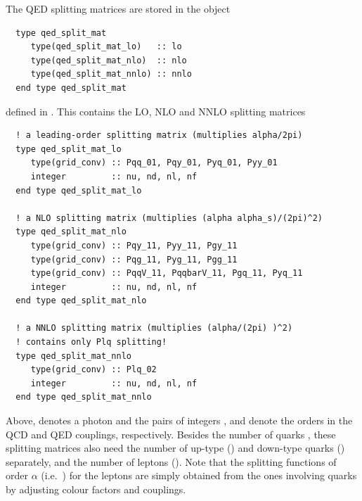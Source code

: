 
The QED splitting matrices are stored in the object

\begin{lstlisting}
  type qed_split_mat
     type(qed_split_mat_lo)   :: lo
     type(qed_split_mat_nlo)  :: nlo
     type(qed_split_mat_nnlo) :: nnlo
  end type qed_split_mat
\end{lstlisting}
defined in . 
This contains the LO, NLO and NNLO splitting matrices 
\begin{lstlisting}
  ! a leading-order splitting matrix (multiplies alpha/2pi)
  type qed_split_mat_lo
     type(grid_conv) :: Pqq_01, Pqy_01, Pyq_01, Pyy_01
     integer         :: nu, nd, nl, nf
  end type qed_split_mat_lo

  ! a NLO splitting matrix (multiplies (alpha alpha_s)/(2pi)^2)
  type qed_split_mat_nlo
     type(grid_conv) :: Pqy_11, Pyy_11, Pgy_11
     type(grid_conv) :: Pqg_11, Pyg_11, Pgg_11
     type(grid_conv) :: PqqV_11, PqqbarV_11, Pgq_11, Pyq_11
     integer         :: nu, nd, nl, nf
  end type qed_split_mat_nlo

  ! a NNLO splitting matrix (multiplies (alpha/(2pi) )^2) 
  ! contains only Plq splitting!
  type qed_split_mat_nnlo 
     type(grid_conv) :: Plq_02
     integer         :: nu, nd, nl, nf
  end type qed_split_mat_nnlo
\end{lstlisting}     
%
Above,  denotes a photon and the pairs of integers ,
 and  denote the orders in the QCD and QED couplings,
respectively. Besides the number of quarks , these splitting
matrices also need the number of up-type () and down-type
quarks () separately, and the number of leptons ().
%
Note that the splitting functions of order $\alpha$ (i.e.\ )
for the leptons are simply obtained from the ones
involving quarks by adjusting colour factors and couplings.

